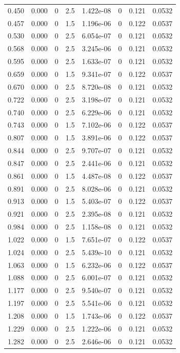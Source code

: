 \documentclass[preview]{standalone}
\begin{document}
{{\begin{tabular}{L{1.2cm}C{1.2cm} C{0.3cm}C{0.5cm} C{1.4cm}C{1.4cm} C{1.4cm}C{1.4cm}}
  0.450  &  0.000  & 0     & 2.5 &  1.422e-08  & 0  & 0.121 &  0.0532   \\ 
  0.457  &  0.000  & 0     & 1.5 &  1.196e-06  & 0  & 0.122 &  0.0537   \\ 
  0.530  &  0.000  & 0     & 2.5 &  6.054e-07  & 0  & 0.121 &  0.0532   \\ 
  0.568  &  0.000  & 0     & 2.5 &  3.245e-06  & 0  & 0.121 &  0.0532   \\ 
  0.595  &  0.000  & 0     & 2.5 &  1.633e-07  & 0  & 0.121 &  0.0532   \\ 
  0.659  &  0.000  & 0     & 1.5 &  9.341e-07  & 0  & 0.122 &  0.0537   \\ 
  0.670  &  0.000  & 0     & 2.5 &  8.720e-08  & 0  & 0.121 &  0.0532   \\ 
  0.722  &  0.000  & 0     & 2.5 &  3.198e-07  & 0  & 0.121 &  0.0532   \\ 
  0.740  &  0.000  & 0     & 2.5 &  6.229e-06  & 0  & 0.121 &  0.0532   \\ 
  0.743  &  0.000  & 0     & 1.5 &  7.102e-06  & 0  & 0.122 &  0.0537   \\ 
  0.807  &  0.000  & 0     & 1.5 &  3.891e-06  & 0  & 0.122 &  0.0537   \\ 
  0.844  &  0.000  & 0     & 2.5 &  9.707e-07  & 0  & 0.121 &  0.0532   \\ 
  0.847  &  0.000  & 0     & 2.5 &  2.441e-06  & 0  & 0.121 &  0.0532   \\ 
  0.861  &  0.000  & 0     & 1.5 &  4.487e-08  & 0  & 0.122 &  0.0537   \\ 
  0.891  &  0.000  & 0     & 2.5 &  8.028e-06  & 0  & 0.121 &  0.0532   \\ 
  0.913  &  0.000  & 0     & 1.5 &  5.403e-07  & 0  & 0.122 &  0.0537   \\ 
  0.921  &  0.000  & 0     & 2.5 &  2.395e-08  & 0  & 0.121 &  0.0532   \\ 
  0.984  &  0.000  & 0     & 2.5 &  1.158e-08  & 0  & 0.121 &  0.0532   \\ 
  1.022  &  0.000  & 0     & 1.5 &  7.651e-07  & 0  & 0.122 &  0.0537   \\ 
  1.024  &  0.000  & 0     & 2.5 &  5.439e-10  & 0  & 0.121 &  0.0532   \\ 
  1.063  &  0.000  & 0     & 1.5 &  6.232e-06  & 0  & 0.122 &  0.0537   \\ 
  1.088  &  0.000  & 0     & 2.5 &  6.001e-07  & 0  & 0.121 &  0.0532   \\ 
  1.177  &  0.000  & 0     & 2.5 &  9.540e-07  & 0  & 0.121 &  0.0532   \\ 
  1.197  &  0.000  & 0     & 2.5 &  5.541e-06  & 0  & 0.121 &  0.0532   \\ 
  1.208  &  0.000  & 0     & 1.5 &  1.743e-06  & 0  & 0.122 &  0.0537   \\ 
  1.229  &  0.000  & 0     & 2.5 &  1.222e-06  & 0  & 0.121 &  0.0532   \\ 
  1.282  &  0.000  & 0     & 2.5 &  2.646e-06  & 0  & 0.121 &  0.0532   \\ 
\hline 
\end{tabular} 

}}
\end{document}
